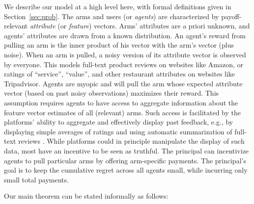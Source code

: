 We describe our model at a high level here,
with formal definitions given in Section~\ref{sec:prob}.
The \ARMNUM arms and users (or \emph{agents})
are characterized by payoff-relevant
\emph{attribute} (or \emph{feature}) vectors.
Arms' attributes are a priori unknown,
and agents' attributes are drawn from a known distribution.
An agent's reward from pulling an arm is the inner product of his
vector with the arm's vector (plus noise).
When an arm is pulled, a noisy version of its attribute vector is
observed by everyone.
This models full-text product reviews on websites like Amazon,
or ratings of ``service'', ``value'',
and other restaurant attributes on websites like Tripadvisor.  
Agents are myopic and will pull the arm whose expected attribute
vector (based on past noisy observations) maximizes their reward.
This assumption requires agents to have access to aggregate
information about the feature vector estimates of all (relevant) arms. 
Such access is facilitated by the platforms' ability to aggregate and
effectively display past feedback, e.g., by displaying simple averages
of ratings and using automatic summarization of full-text reviews 
\citep{wang2010product,liu2012movie,abulaish2009feature}.
While platforms could in principle manipulate the display of such
data, most have an incentive to be seen as truthful.
The principal can incentivize agents to pull particular arms by
offering arm-specific payments.
The principal's goal is to keep the cumulative regret across all
agents small, while incurring only small total payments.

Our main theorem can be stated informally as follows:

